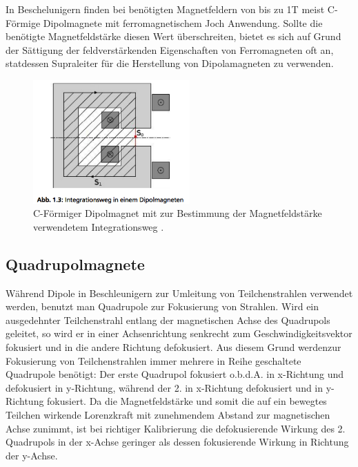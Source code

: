 \documentclass[bigchapter,colorback,accentcolor=tud4b,linedtoc,11pt]{tudreport}
\begin{document}
In Beschelunigern finden bei benötigten Magnetfeldern von bis zu 1T meist C-Förmige Dipolmagnete mit ferromagnetischem Joch Anwendung. Sollte die benötigte Magnetfeldstärke diesen Wert überschreiten, bietet es sich auf Grund der Sättigung der feldverstärkenden Eigenschaften von Ferromagneten oft an, statdessen Supraleiter für die Herstellung von Dipolamagneten zu verwenden.

\begin{figure}[H]
\centering
\includegraphics[width=60mm]{img/dipol.png}
\caption{C-Förmiger Dipolmagnet mit zur Bestimmung der Magnetfeldstärke verwendetem Integrationsweg \cite{anleitung}.}
\end{figure}

\subsection{Quadrupolmagnete}

Während Dipole in Beschleunigern zur Umleitung von Teilchenstrahlen verwendet werden, benutzt man Quadrupole zur Fokusierung von Strahlen. Wird ein ausgedehnter Teilchenstrahl entlang der  magnetischen Achse des Quadrupols geleitet, so wird er in einer Achsenrichtung senkrecht zum Geschwindigkeitsvektor fokusiert und in die andere Richtung defokusiert. Aus diesem Grund werdenzur Fokusierung von Teilchenstrahlen immer mehrere in Reihe geschaltete Quadrupole benötigt: Der erste Quadrupol fokusiert o.b.d.A. in x-Richtung und defokusiert in y-Richtung, während der 2. in x-Richtung defokusiert und in y-Richtung fokusiert. Da die Magnetfeldstärke und somit die auf ein bewegtes Teilchen wirkende Lorenzkraft mit zunehmendem Abstand zur magnetischen Achse zunimmt, ist bei richtiger Kalibrierung die defokusierende Wirkung des 2. Quadrupols in der x-Achse geringer als dessen fokusierende Wirkung in Richtung der y-Achse.
\end{document}
